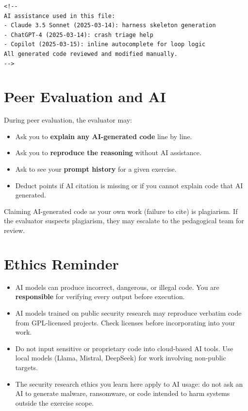 \begin{verbatim}
<!--
AI assistance used in this file:
- Claude 3.5 Sonnet (2025-03-14): harness skeleton generation
- ChatGPT-4 (2025-03-14): crash triage help
- Copilot (2025-03-15): inline autocomplete for loop logic
All generated code reviewed and modified manually.
-->
\end{verbatim}

\section{Peer Evaluation and AI}

During peer evaluation, the evaluator may:

\begin{itemize}
  \item Ask you to \textbf{explain any AI-generated code} line by line.
  \item Ask you to \textbf{reproduce the reasoning} without AI assistance.
  \item Ask to see your \textbf{prompt history} for a given exercise.
  \item Deduct points if AI citation is missing or if you cannot
        explain code that AI generated.
\end{itemize}

\begin{warning}
  Claiming AI-generated code as your own work (failure to cite)
  is plagiarism. If the evaluator suspects plagiarism, they may
  escalate to the pedagogical team for review.
\end{warning}

\section{Ethics Reminder}

\begin{itemize}
  \item AI models can produce incorrect, dangerous, or illegal code.
        You are \textbf{responsible} for verifying every output before
        execution.
  \item AI models trained on public security research may reproduce
        verbatim code from GPL-licensed projects. Check licenses
        before incorporating into your work.
  \item Do not input sensitive or proprietary code into cloud-based
        AI tools. Use local models (Llama, Mistral, DeepSeek) for
        work involving non-public targets.
  \item The security research ethics you learn here apply to AI
        usage: do not ask an AI to generate malware, ransomware,
        or code intended to harm systems outside the exercise scope.
\end{itemize}


